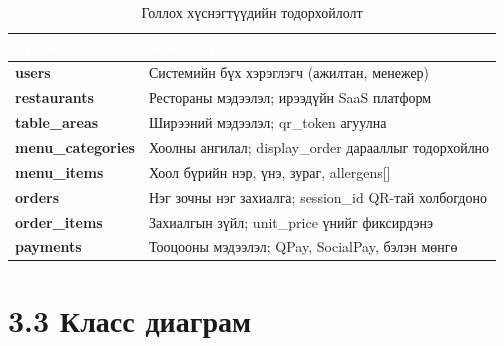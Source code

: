 \begin{table}[htbp]
\caption{Голлох хүснэгтүүдийн тодорхойлолт}
\label{tab:tables}
\centering
\begin{tabularx}{\textwidth}{|>{\bfseries}X|X|}
\hline
\rowcolor{TableHeader}\textcolor{white}{\textbf{Хүснэгт}}
  & \textcolor{white}{\textbf{Зориулалт}} \\ \hline
users          & Системийн бүх хэрэглэгч (ажилтан, менежер) \\ \hline
restaurants    & Рестораны мэдээлэл; ирээдүйн SaaS платформ \\ \hline
table\_areas   & Ширээний мэдээлэл; qr\_token агуулна \\ \hline
menu\_categories & Хоолны ангилал; display\_order дарааллыг тодорхойлно \\ \hline
menu\_items    & Хоол бүрийн нэр, үнэ, зураг, allergens[] \\ \hline
orders         & Нэг зочны нэг захиалга; session\_id QR-тай холбогдоно \\ \hline
order\_items   & Захиалгын зүйл; unit\_price үнийг фиксирдэнэ \\ \hline
payments       & Тооцооны мэдээлэл; QPay, SocialPay, бэлэн мөнгө \\ \hline
\end{tabularx}
\end{table}

\section{3.3 Класс диаграм}

